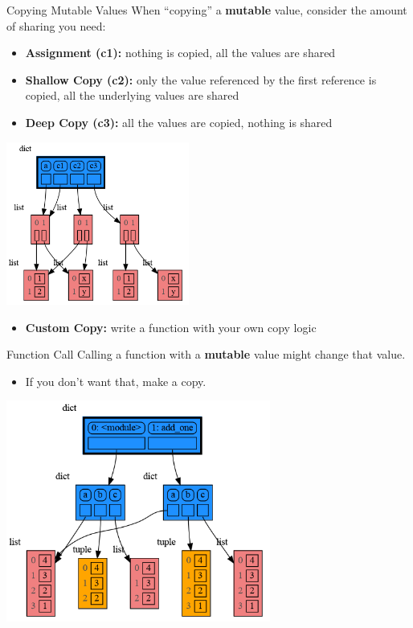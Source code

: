 \documentclass[10pt, colorlinks=true, urlcolor=blue]{beamer}
\begin{document}
\begin{frame}{Copying Mutable Values}
  When ``copying'' a \textbf{mutable} value, consider the amount of sharing you need:
    \begin{itemize}
        \item \textbf{Assignment (c1):} nothing is copied, all the values are shared
        \item \textbf{Shallow Copy (c2):} only the value referenced by the first reference is copied, all the underlying values are shared
        \item \textbf{Deep Copy (c3):} all the values are copied, nothing is shared
    \end{itemize}
    
    \vspace{-1em}
    \begin{center}\includegraphics[width=0.45\textwidth]{figures/copy.png}\end{center}
    \vspace{-1em}
    
    \begin{itemize}
        \item \textbf{Custom Copy:} write a function with your own copy logic
    \end{itemize}
\end{frame}

\begin{frame}{Function Call}
  Calling a function with a \textbf{mutable} value might change that value.
  \begin{itemize}
  \item If you don't want that, make a copy.
  \end{itemize}
  \begin{center}\includegraphics[width=0.65\textwidth]{figures/function_call.png}\end{center}
\end{frame}
\end{document}
